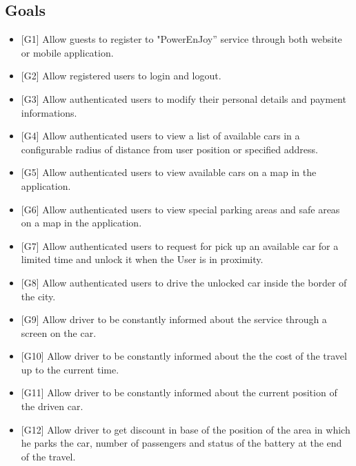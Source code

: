 \documentclass[english]{article}
\begin{document}
\subsection{Goals}
\begin{itemize}
	\item {[}G1{]} Allow guests to register to "PowerEnJoy'' service through
	both website or mobile application.
	\item {[}G2{]} Allow registered users to login and logout.
	\item {[}G3{]} Allow authenticated users to modify their personal details
	and payment informations.
	\item {[}G4{]} Allow authenticated users to view a list of available cars
	in a configurable radius of distance from user position or specified
	address.
	

	\item {[}G5{]} Allow authenticated users to view available cars on a map in the application.
	\item {[}G6{]} Allow authenticated users to view special parking areas and safe areas on a map in the application.
		
	\item {[}G7{]} Allow authenticated users to request for pick up an available
	car for a limited time and unlock it when the User is in proximity.
	
	\item {[}G8{]} Allow authenticated users to drive the unlocked car inside
	the border of the city.
	
	\item {[}G9{]} Allow driver to be constantly informed about the service through a screen on the car.
	\item {[}G10{]} Allow driver to be constantly informed about the the cost of the travel up to the current time.
	\item {[}G11{]} Allow driver to be constantly informed about the current position of the driven car.
	\item {[}G12{]} Allow driver to get discount in base of the position of the area in which he parks the car, 
	number of passengers and status of the battery at the end of the travel.


\end{itemize}
\end{document}
